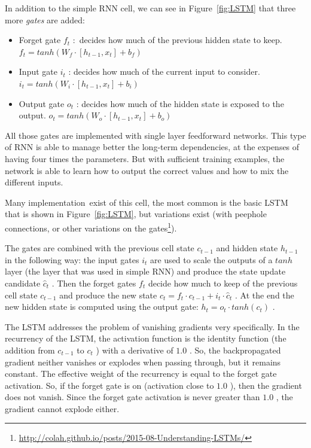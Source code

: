 In addition to the simple RNN cell, we can see in Figure~\ref{fig:LSTM} that three more \textit{gates} are added:

\begin{itemize}
	\item Forget gate  \( f_{t} \) :\ decides how much of the previous hidden state to keep.   \( f_{t}=tanh \left( W_{f}\cdot  \left[ h_{t-1}, x_{t} \right]  + b_{f} \right)  \) 

	\item Input gate  \( i_{t} \) : decides how much of the current input to consider.  \( i_{t}=tanh \left( W_{i}\cdot  \left[ h_{t-1}, x_{t} \right]  + b_{i} \right)  \) 

	\item Output gate  \( o_{t} \) : decides how much of the hidden state is exposed to the output.  \( o_{t}=tanh \left( W_{o}\cdot  \left[ h_{t-1}, x_{t} \right]  + b_{o} \right)  \) 
\end{itemize}

All those gates are implemented with single layer feedforward networks. This type of RNN is able to manage better the long-term dependencies, at the expenses of having four times the parameters. But with sufficient training examples, the network is able to learn how to output the correct values and how to mix the different inputs.

Many implementation\ exist of this cell, the most common is the basic LSTM that is shown in  Figure~\ref{fig:LSTM}, but variations exist (with peephole connections, or other variations on the gates\footnote{\url{http://colah.github.io/posts/2015-08-Understanding-LSTMs/}}).

The gates are combined with the previous cell state  \( c_{t-1} \)  and hidden state  \( h_{t-1} \)  in the following way: the input gates  \( i_{t} \) are used to scale the outputs of a  \( tanh \)  layer (the layer that was used in simple RNN) and produce the state update candidate  \( \hat c_{t} \) . Then the forget gates  \( f_{t} \)  decide how much to keep of the previous cell state  \( c_{t-1} \)  and produce the new state  \( c_{t}=f_{t}\cdot c_{t-1}+i_{t}\cdot \hat c_{t} \) . At the end the new hidden state is computed using the output gate:  \( h_{t}=o_{t}\cdot tanh \left( c_{t} \right)  \) .

The LSTM addresses the problem of vanishing gradients very specifically. In the recurrency of the LSTM, the activation function is the identity function (the addition from  \( c_{t-1} \)  to  \( c_{t} \) ) with a derivative of  \( 1.0 \) . So, the backpropagated gradient neither vanishes or explodes when passing through, but it remains constant. The effective weight of the recurrency is equal to the forget gate activation. So, if the forget gate is on (activation close to  \( 1.0 \) ), then the gradient does not vanish. Since the forget gate activation is never greater than  \( 1.0 \) , the gradient cannot explode either.

